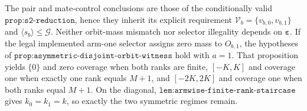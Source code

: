 The pair and mate-control conclusions are those of the conditionally valid \(\texttt{prop:s2-reduction}\), hence they inherit its explicit requirement \(\mathcal V_b=\{v_{b,0},v_{b,1}\}\) and \(\langle s_b\rangle\le\mathcal G\). Neither orbit-mass mismatch nor selector illegality depends on \(\boldsymbol\varepsilon\). If the legal implemented arm-one selector assigns zero mass to \(O_{b,1}\), the hypotheses of \(\texttt{prop:asymmetric-disjoint-orbit-witness}\) hold with \(a=1\). That proposition yields \(\{0\}\) and zero coverage when both ranks are finite, \([-K,K]\) and coverage one when exactly one rank equals \(M+1\), and \([-2K,2K]\) and coverage one when both ranks equal \(M+1\). On the diagonal, \(\texttt{lem:armwise-finite-rank-staircase}\) gives \(k_0=k_1=k\), so exactly the two symmetric regimes remain.